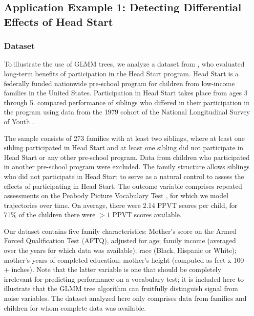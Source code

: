 \documentclass[doc,floatsintext,natbib]{apa7}
\begin{document}


\subsection{Application Example 1: Detecting Differential Effects of Head Start}
\label{sec:TutorialMixed}



\subsubsection{Dataset}

To illustrate the use of GLMM trees, we analyze a dataset from \cite{Demi09}, who evaluated long-term benefits of participation in the Head Start program. Head Start is a federally funded nationwide pre-school program for children from low-income families in the United States. Participation in Head Start takes place from ages 3 through 5. \cite{Demi09} compared performance of siblings who differed in their participation in the program using data from the 1979 cohort of the National Longitudinal Survey of Youth \citep{NLSY}. 

The sample consists of 273 families with at least two siblings, where at least one sibling participated in Head Start and at least one sibling did not participate in Head Start or any other pre-school program. Data from children who participated in another pre-school program were excluded. The family structure allows siblings who did not participate in Head Start to serve as a natural control to assess the effects of participating in Head Start. The outcome variable comprises repeated assessments on the Peabody Picture Vocabulary Test \citep[PPVT; ][]{DunnyDunn81}, for which we model trajectories over time. On average, there were 2.14 PPVT scores per child, for 71\% of the children there were $>1$ PPVT scores available. 


Our dataset contains five family characteristics: Mother's score on the Armed Forced Qualification Test (AFTQ), adjusted for age; family income (averaged over the years for which data was available); race (Black, Hispanic or White); mother's years of completed education; mother's height (computed as feet x 100 + inches). Note that the latter variable is one that should be completely irrelevant for predicting performance on a vocabulary test; it is included here to illustrate that the GLMM tree algorithm can fruitfully distinguish signal from noise variables. The dataset analyzed here only comprises data from families and children for whom complete data was available. 
\end{document}

